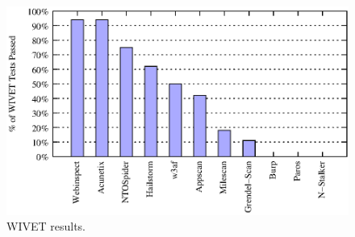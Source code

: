 \begin{figure}[tb]
  \centering
  \includegraphics{wivet_graph}
  \caption{WIVET results.}
  \label{wivet}
\end{figure}
